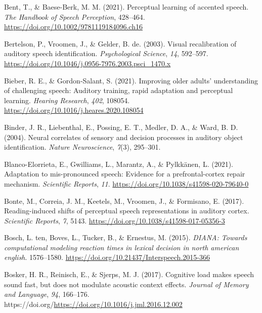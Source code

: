 \documentclass[
  11pt,
  english,
  man,floatsintext]{apa6}
\newlength{\cslhangindent}
\newlength{\cslentryspacingunit} %
\newenvironment{CSLReferences}[2] %
 {%
  \setlength{\parindent}{0pt}
  \ifodd #1
  \let\oldpar\par
  \def\par{\hangindent=\cslhangindent\oldpar}
  \fi
  \setlength{\parskip}{#2\cslentryspacingunit}
 }%
 {}
\begin{document}
\begin{CSLReferences}{1}{0}
\leavevmode{}%
Bent, T., \& Baese-Berk, M. M. (2021). Perceptual learning of accented speech. \emph{The Handbook of Speech Perception}, 428--464. \url{https://doi.org/10.1002/9781119184096.ch16}

\leavevmode{}%
Bertelson, P., Vroomen, J., \& Gelder, B. de. (2003). Visual recalibration of auditory speech identification. \emph{Psychological Science}, \emph{14}, 592--597. \url{https://doi.org/10.1046/j.0956-7976.2003.psci_1470.x}

\leavevmode{}%
Bieber, R. E., \& Gordon-Salant, S. (2021). Improving older adults' understanding of challenging speech: Auditory training, rapid adaptation and perceptual learning. \emph{Hearing Research}, \emph{402}, 108054. \url{https://doi.org/10.1016/j.heares.2020.108054}

\leavevmode{}%
Binder, J. R., Liebenthal, E., Possing, E. T., Medler, D. A., \& Ward, B. D. (2004). Neural correlates of sensory and decision processes in auditory object identification. \emph{Nature Neuroscience}, \emph{7}(3), 295--301.

\leavevmode{}%
Blanco-Elorrieta, E., Gwilliams, L., Marantz, A., \& Pylkkänen, L. (2021). Adaptation to mis-pronounced speech: Evidence for a prefrontal-cortex repair mechanism. \emph{Scientific Reports}, \emph{11}. \url{https://doi.org/10.1038/s41598-020-79640-0}

\leavevmode{}%
Bonte, M., Correia, J. M., Keetels, M., Vroomen, J., \& Formisano, E. (2017). Reading-induced shifts of perceptual speech representations in auditory cortex. \emph{Scientific Reports}, \emph{7}, 5143. \url{https://doi.org/10.1038/s41598-017-05356-3}

\leavevmode{}%
Bosch, L. ten, Boves, L., Tucker, B., \& Ernestus, M. (2015). \emph{DIANA: Towards computational modeling reaction times in lexical decision in north american english}. 1576--1580. \url{https://doi.org/10.21437/Interspeech.2015-366}

\leavevmode{}%
Bosker, H. R., Reinisch, E., \& Sjerps, M. J. (2017). Cognitive load makes speech sound fast, but does not modulate acoustic context effects. \emph{Journal of Memory and Language}, \emph{94}, 166--176. https://doi.org/\url{https://doi.org/10.1016/j.jml.2016.12.002}


\end{CSLReferences}
\end{document}
